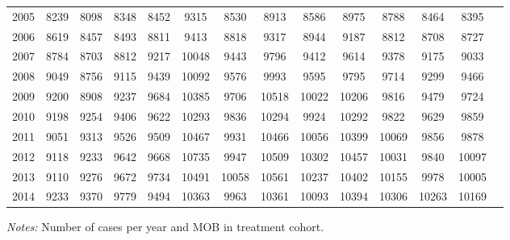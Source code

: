 \begin{table}[H]
\begin{threeparttable}
{\begin{tabular}{l*{13}{c}}
2005        &        8239&        8098&        8348&        8452&        9315&        8530&        8913&        8586&        8975&        8788&        8464&        8395\\
2006        &        8619&        8457&        8493&        8811&        9413&        8818&        9317&        8944&        9187&        8812&        8708&        8727\\
2007        &        8784&        8703&        8812&        9217&       10048&        9443&        9796&        9412&        9614&        9378&        9175&        9033\\
2008        &        9049&        8756&        9115&        9439&       10092&        9576&        9993&        9595&        9795&        9714&        9299&        9466\\
2009        &        9200&        8908&        9237&        9684&       10385&        9706&       10518&       10022&       10206&        9816&        9479&        9724\\
2010        &        9198&        9254&        9406&        9622&       10293&        9836&       10294&        9924&       10292&        9822&        9629&        9859\\
2011        &        9051&        9313&        9526&        9509&       10467&        9931&       10466&       10056&       10399&       10069&        9856&        9878\\
2012        &        9118&        9233&        9642&        9668&       10735&        9947&       10509&       10302&       10457&       10031&        9840&       10097\\
2013        &        9110&        9276&        9672&        9734&       10491&       10058&       10561&       10237&       10402&       10155&        9978&       10005\\
2014        &        9233&        9370&        9779&        9494&       10363&        9963&       10361&       10093&       10394&       10306&       10263&       10169\\
 \bottomrule \end{tabular} } \begin{tablenotes} \item \scriptsize \emph{Notes:} Number of cases per year and MOB in treatment cohort. \end{tablenotes} \end{threeparttable} \end{table} 
